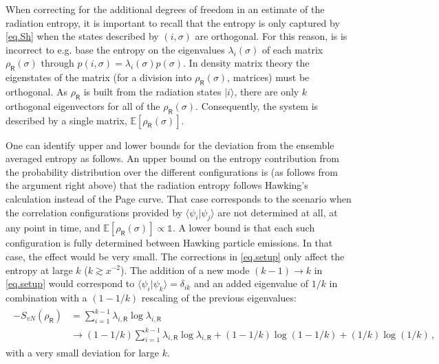 \documentclass[11pt]{article}
\numberwithin{equation}{section}
\begin{document}
When correcting for the additional degrees of freedom in an estimate of the radiation entropy, it is important to recall that the entropy is only captured by \eqref{eq.Sh} when the states described by $(i,\sigma)$ are orthogonal. For this reason, is is incorrect to e.g. base the entropy on the eigenvalues $\lambda_i(\sigma)$ of each matrix $\rho_\textsf{R}(\sigma)$ through $p(i,\sigma)=\lambda_i(\sigma)p(\sigma)$. In density matrix theory the eigenstates of the matrix (for a division into $\rho_\textsf{R}(\sigma)$, matrices) must be orthogonal. As $\rho_\textsf{R}$ is built from the radiation states $|i\rangle$, there are only $k$ orthogonal eigenvectors for all of the $\rho_\textsf{R}(\sigma)$. Consequently, the system is described by a single matrix, $\mathbb{E}[\rho_\textsf{R}(\sigma)]$.

One can identify upper and lower bounds for the deviation from the ensemble averaged entropy as follows. An upper bound on the entropy contribution from the probability distribution over the different configurations is (as follows from the argument right above) that the radiation entropy follows Hawking's calculation instead of the Page curve. That case corresponds to the scenario when the correlation configurations provided by $\langle\psi_i|\psi_j\rangle$ are not determined at all, at any point in time, and $\mathbb{E}[\rho_\textsf{R}(\sigma)]\propto\mathbb{1}$. A lower bound is that each such configuration is fully determined between Hawking particle emissions. In that case, the effect would be very small. The corrections in \eqref{eq.setup} only affect the entropy at large $k$ ($k\gtrsim x^{-2}$). The addition of a new mode $(k-1)\rightarrow k$ in \eqref{eq.setup} would correspond to $\langle\psi_i|\psi_k\rangle=\delta_{ik}$ and an added eigenvalue of $1/k$ in combination with a $(1-1/k)$ rescaling of the previous eigenvalues:
\begin{gather}\begin{aligned}
-S_{vN}(\rho_\textsf{R})&=\sum_{i=1}^{k-1}\lambda_{i,\textsf{R}}\log\lambda_{i,\textsf{R}}\\
&\rightarrow \left(1-1/k\right)\sum_{i=1}^{k-1}\lambda_{i,\textsf{R}}\log\lambda_{i,\textsf{R}}+(1-1/k)\log(1-1/k)+(1/k)\log(1/k)\,,
\end{aligned}\end{gather}
with a very small deviation for large $k$.
\end{document}
